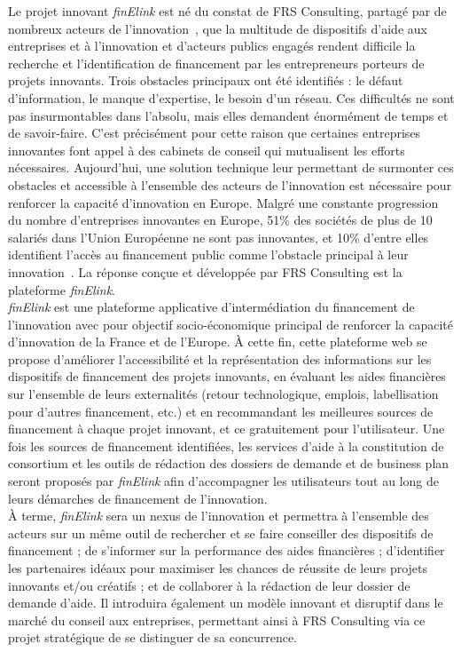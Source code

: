 Le projet innovant \textit{finElink} est né du constat de FRS Consulting, partagé par de nombreux acteurs de l'innovation~\cite{InnovFR}, que la multitude de dispositifs d'aide aux entreprises et à l'innovation et d'acteurs publics engagés rendent difficile la recherche et l'identification de financement par les entrepreneurs porteurs de projets innovants. 
Trois obstacles principaux ont été identifiés : le défaut d'information, le manque d'expertise, le besoin d'un réseau. Ces difficultés ne sont pas insurmontables dans l'absolu, mais elles demandent énormément de temps et de savoir-faire. C'est précisément pour cette raison que certaines entreprises innovantes font appel à des cabinets de conseil qui mutualisent les efforts nécessaires. Aujourd'hui, une solution technique leur permettant de surmonter ces obstacles et accessible à l'ensemble des acteurs de l'innovation est nécessaire pour renforcer la capacité d'innovation en Europe. Malgré une constante progression du nombre d'entreprises innovantes en Europe, 51\% des sociétés de plus de 10 salariés dans l'Union Européenne ne sont pas innovantes, et 10\% d'entre elles identifient l'accès au financement public comme l'obstacle principal à leur innovation~\cite{Eurostat}. La réponse conçue et développée par FRS Consulting est la plateforme \textit{finElink}.\\

\textit{finElink} est une plateforme applicative d'intermédiation du financement de l'innovation avec pour objectif socio-économique principal de renforcer la capacité d'innovation de la France et de l'Europe. À cette fin, cette plateforme web se propose d'améliorer l'accessibilité et la représentation des informations sur les dispositifs de financement des projets innovants, en évaluant les aides financières sur l'ensemble de leurs externalités (retour technologique, emplois, labellisation pour d'autres financement, etc.) et en recommandant les meilleures sources de financement à chaque projet innovant, et ce gratuitement pour l'utilisateur. Une fois les sources de financement identifiées, les services d'aide à la constitution de consortium et les outils de rédaction des dossiers de demande et de business plan seront proposés par \textit{finElink} afin d'accompagner les utilisateurs tout au long de leurs démarches de financement de l'innovation.\\

À terme, \textit{finElink} sera un nexus de l'innovation et permettra à l'ensemble des acteurs sur un même outil de rechercher et se faire conseiller des dispositifs de financement ; de s'informer sur la performance des aides financières ; d'identifier les partenaires idéaux pour maximiser les chances de réussite de leurs projets innovants et/ou créatifs ; et de collaborer à la rédaction de leur dossier de demande d'aide. Il introduira également un modèle innovant et disruptif dans le marché du conseil aux entreprises, permettant ainsi à FRS Consulting via ce projet stratégique de se distinguer de sa concurrence.\\

